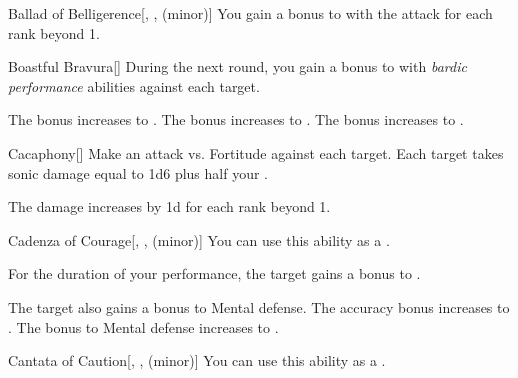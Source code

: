 {\begin{freeability}{Ballad of Belligerence}[, ,  (minor)]
                \rankline
                You gain a  bonus to  with the attack for each rank beyond 1.
            \end{freeability}

            \begin{freeability}{Boastful Bravura}[]
                During the next round, you gain a  bonus to  with \textit{bardic performance} abilities against each target.

                \rankline
                 The bonus increases to .
                 The bonus increases to .
                 The bonus increases to .
            \end{freeability}

            \begin{freeability}{Cacaphony}[]
                Make an attack vs. Fortitude against each target.
                \hit Each target takes sonic damage equal to 1d6 plus half your .

                \rankline
                The damage increases by \plus1d for each rank beyond 1.
            \end{freeability}

            \begin{freeability}{Cadenza of Courage}[, ,  (minor)]
                You can use this ability as a .

                For the duration of your performance, the target gains a  bonus to .

                \rankline
                 The target also gains a  bonus to Mental defense.
                 The accuracy bonus increases to .
                 The bonus to Mental defense increases to .
            \end{freeability}

            \begin{freeability}{Cantata of Caution}[, ,  (minor)]
                You can use this ability as a .


\end{freeability}}

